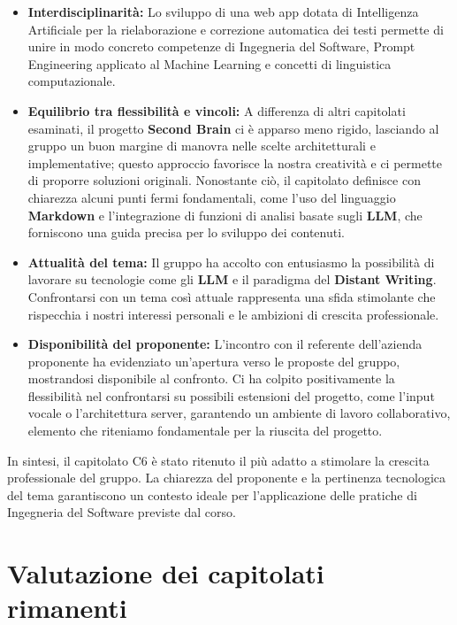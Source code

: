 \documentclass[a4paper, 10pt, colorlinks=true, linkcolor=black, urlcolor=blue, citecolor=blue, hidelinks]{article}
\begin{document}
\begin{itemize}

    \item \textbf{Interdisciplinarità:} Lo sviluppo di una web app dotata di Intelligenza Artificiale per la rielaborazione e correzione automatica dei testi permette di unire in modo concreto competenze di Ingegneria del Software, Prompt Engineering applicato al Machine Learning e concetti di linguistica computazionale. 

    \item \textbf{Equilibrio tra flessibilità e vincoli:} A differenza di altri capitolati esaminati, il progetto \textbf{Second Brain} ci è apparso meno rigido, lasciando al gruppo un buon margine di manovra nelle scelte architetturali e implementative; questo approccio favorisce la nostra creatività e ci permette di proporre soluzioni originali. Nonostante ciò, il capitolato definisce con chiarezza alcuni punti fermi fondamentali, come l'uso del linguaggio \textbf{Markdown}  e l'integrazione di funzioni di analisi basate sugli \textbf{LLM}, che forniscono una guida precisa per lo sviluppo dei contenuti.

    \item \textbf{Attualità del tema:} Il gruppo ha accolto con entusiasmo la possibilità di lavorare su tecnologie come gli \textbf{LLM} e il paradigma del \textbf{Distant Writing}. Confrontarsi con un tema così attuale rappresenta una sfida stimolante che rispecchia i nostri interessi personali e le ambizioni di crescita professionale.
    
    \item \textbf{Disponibilità del proponente:} L'incontro con il referente dell'azienda proponente ha evidenziato un'apertura verso le proposte del gruppo, mostrandosi disponibile al confronto. Ci ha colpito positivamente la flessibilità nel confrontarsi su possibili estensioni del progetto, come l'input vocale o l'architettura server, garantendo un ambiente di lavoro collaborativo, elemento che riteniamo fondamentale per la riuscita del progetto.
\end{itemize}

In sintesi, il capitolato C6 è stato ritenuto il più adatto a stimolare la crescita professionale del gruppo. La chiarezza del proponente e la pertinenza tecnologica del tema garantiscono un contesto ideale per l'applicazione delle pratiche di Ingegneria del Software previste dal corso.

\section{Valutazione dei capitolati rimanenti}
\end{document}
